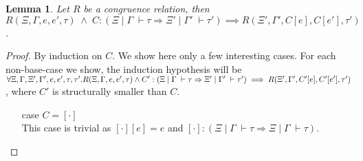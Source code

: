 \documentclass[a4paper, 11pt]{report}
\newtheorem{lemma}[theorem]{Lemma}
\theoremstyle{definition}
\newcommand{\expr}{e}
\newcommand{\empctx}{[\cdot]}
\newcommand{\ctx}{C}
\newcommand{\Tint}{\mathbb{Z}}
\newcommand{\typ}{\tau}
\newcommand{\venv}{\Gamma}
\newcommand{\tenv}{\Xi}
\newcommand{\jdg}[4]{#1 \; | \; #2 \; \vdash #3 : #4}
\newcommand{\jdgType}[3]{#1 \; | \; #2 \; \vdash #3}
\newcommand{\jdgRel}[6]{#1 \; | \; #2 \; \vdash #3 \approx^{#4} #5 : #6}
\begin{document}
\begin{lemma}\label{lem:CE_eq_part2_helper}
  Let $R$ be a congruence relation, then $R(\tenv, \venv, \expr, \expr', \typ) \; \land \; \ctx:(\jdgType{\tenv}{\venv}{\typ} \Rightarrow \jdgType{\tenv'}{\venv'}{\typ'}) \implies R(\tenv', \venv', C[\expr], C[\expr'], \typ')$.
\end{lemma}
\begin{proof}
  By induction on $\ctx$. We show here only a few interesting cases.
  For each non-base-case we show, the induction hypothesis will be $\forall \tenv, \venv, \tenv', \venv', \expr, \expr', \typ, \typ' .\\ R(\tenv, \venv, \expr, \expr', \typ) \land \ctx' : (\jdgType{\tenv}{\venv}{\typ} \Rightarrow \jdgType{\tenv'}{\venv'}{\typ'}) \implies R(\tenv', \venv', \ctx'[\expr], \ctx'[\expr'], \typ')$, where $\ctx'$ is structurally smaller than $\ctx$.
  \begin{itemize}
    \item[case] $\ctx = \empctx$\\
      This case is trivial as $\empctx [\expr] = \expr$ and $\empctx : (\jdgType{\tenv}{\venv}{\typ} \Rightarrow \jdgType{\tenv}{\venv}{\typ})$.

\end{itemize}
\end{proof}
\end{document}
